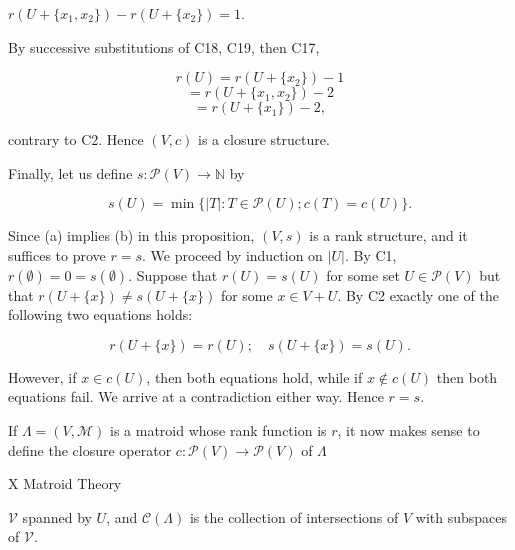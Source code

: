 $r(U + \{x_1, x_2\}) - r(U + \{x_2\}) = 1.$

By successive substitutions of C18, C19, then C17,

$$r(U) = r(U + \{x_2\}) - 1$$
$$= r(U + \{x_1, x_2\}) - 2$$
$$= r(U + \{x_1\}) - 2,$$

contrary to C2. Hence $(V, c)$ is a closure structure.

Finally, let us define $s: \mathcal{P}(V) \to \mathbb{N}$ by

$$s(U) = \min\{|T|: T \in \mathcal{P}(U); c(T) = c(U)\}.$$

Since (a) implies (b) in this proposition, $(V, s)$ is a rank structure, and it suffices to prove $r = s$. We proceed by induction on $|U|$. By C1, $r(\emptyset) = 0 = s(\emptyset)$. Suppose that $r(U) = s(U)$ for some set $U \in \mathcal{P}(V)$ but that $r(U + \{x\}) \neq s(U + \{x\})$ for some $x \in V + U$. By C2 exactly one of the following two equations holds:

$$r(U + \{x\}) = r(U); \quad s(U + \{x\}) = s(U).$$

However, if $x \in c(U)$, then both equations hold, while if $x \notin c(U)$ then both equations fail. We arrive at a contradiction either way. Hence $r = s.$

If $\Lambda = (V, \mathcal{M})$ is a matroid whose rank function is $r$, it now makes sense to define the closure operator $c: \mathcal{P}(V) \to \mathcal{P}(V)$ of $\Lambda$

X Matroid Theory

$\mathcal{V}$ spanned by $U$, and $\mathcal{C}(\Lambda)$ is the collection of intersections of $V$ with subspaces of $\mathcal{V}$.
